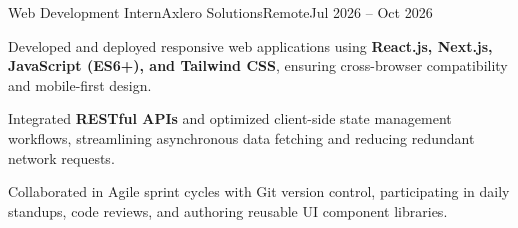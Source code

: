 \begin{cventry}{Web Development Intern}{Axlero Solutions}{Remote}{Jul 2026 -- Oct 2026}
    \item Developed and deployed responsive web applications using \textbf{React.js, Next.js, JavaScript (ES6+), and Tailwind CSS}, ensuring cross-browser compatibility and mobile-first design.
    \item Integrated \textbf{RESTful APIs} and optimized client-side state management workflows, streamlining asynchronous data fetching and reducing redundant network requests.
    \item Collaborated in Agile sprint cycles with Git version control, participating in daily standups, code reviews, and authoring reusable UI component libraries.
\end{cventry}
